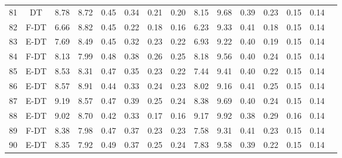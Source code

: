 \begin{longtable}{@{\hskip3pt}c@{\hskip3pt}c@{\hskip3pt}c@{\hskip3pt}c@{\hskip3pt}c@{\hskip3pt}c@{\hskip3pt}c@{\hskip3pt}c@{\hskip3pt}c@{\hskip3pt}c@{\hskip3pt}c@{\hskip3pt}c@{\hskip3pt}c@{\hskip3pt}c@{\hskip3pt}c}
         81 &             DT &              8.78 &        8.72 &          0.45 &        0.34 &        0.21 &         0.20 &                8.15 &        9.68 &          0.39 &        0.23 &        0.15 &         0.14 \\
         82 &           F-DT &              6.66 &        8.82 &          0.45 &        0.22 &        0.18 &         0.16 &                6.23 &        9.33 &          0.41 &        0.18 &        0.15 &         0.14 \\
         83 &           E-DT &              7.69 &        8.49 &          0.45 &        0.32 &        0.23 &         0.22 &                6.93 &        9.22 &          0.40 &        0.19 &        0.15 &         0.14 \\
         84 &           F-DT &              8.13 &        7.99 &          0.48 &        0.38 &        0.26 &         0.25 &                8.18 &        9.56 &          0.40 &        0.24 &        0.15 &         0.14 \\
         85 &           E-DT &              8.53 &        8.31 &          0.47 &        0.35 &        0.23 &         0.22 &                7.44 &        9.41 &          0.40 &        0.22 &        0.15 &         0.14 \\
         86 &           E-DT &              8.57 &        8.91 &          0.44 &        0.33 &        0.24 &         0.23 &                8.02 &        9.16 &          0.41 &        0.25 &        0.15 &         0.14 \\
         87 &           E-DT &              9.19 &        8.57 &          0.47 &        0.39 &        0.25 &         0.24 &                8.38 &        9.69 &          0.40 &        0.24 &        0.15 &         0.14 \\
         88 &           E-DT &              9.02 &        8.70 &          0.42 &        0.33 &        0.17 &         0.16 &                9.17 &        9.92 &          0.38 &        0.29 &        0.16 &         0.14 \\
         89 &           F-DT &              8.38 &        7.98 &          0.47 &        0.37 &        0.23 &         0.23 &                7.58 &        9.31 &          0.41 &        0.23 &        0.15 &         0.14 \\
         90 &           E-DT &              8.35 &        7.92 &          0.49 &        0.37 &        0.25 &         0.24 &                7.83 &        9.58 &          0.39 &        0.22 &        0.15 &         0.14 \\

\end{longtable}
